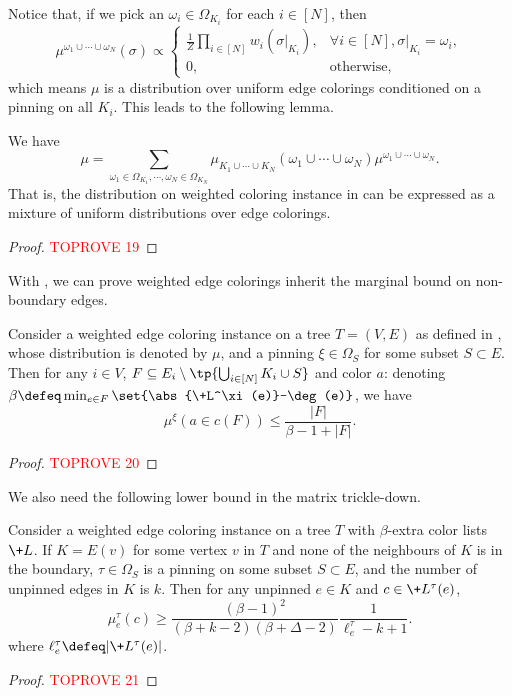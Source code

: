 \documentclass[a4paper,11pt]{article}
\begin{document}
Notice that, if we pick an $\omega_i\in\Omega_{K_i}$ for each $i\in [N]$,
then
\[\mu^{\omega_1\cup\cdots\cup \omega_N}(\sigma)
\propto
\begin{cases}
 \frac{1}{Z}   \prod_{i\in [N]} w_i(\sigma|_{K_i}),  &\forall i\in [N], \sigma|_{K_i} = \omega_i,
 \\ 0, & \text{otherwise},
\end{cases}
\]
which means $\mu$ is a distribution over uniform edge colorings conditioned on a 
pinning on all $K_i$. This leads to the following lemma.
\begin{lemma}\label{lem:weighted-decomposition-to-unweighted}
    We have
    \[
        \mu = \sum_{\omega_1\in \Omega_{K_1},\cdots, \omega_N\in \Omega_{K_N}}
        \mu_{K_1\cup\cdots\cup K_N}(\omega_1\cup\cdots\cup\omega_{N}) \mu^{\omega_1\cup\cdots\cup\omega_N}.
    \]
    That is, the distribution on weighted coloring instance in 
    can be expressed as a mixture of uniform distributions over edge colorings.
\end{lemma}
\begin{proof}\textcolor{red}{TOPROVE 19}\end{proof}

With , we can prove
weighted edge colorings inherit the marginal bound 
on non-boundary edges.
\begin{lemma}\label{lem:marginal-upper-weighted}
    Consider a weighted edge coloring instance on a tree $T=(V, E)$
    as defined in ,
    whose distribution is denoted by $\mu$, and a pinning $\xi\in \Omega_{S}$ for some subset $S\subset E$.
    Then for any $i\in V$, $F\subseteq E_i\setminus \tp{\bigcup_{i\in [N]}K_i\cup S}$ and color $a$:
    denoting $\beta\defeq\min_{e\in F}\set{\abs{\+L^\xi(e)}-\deg(e)}$, we have
    \[\mu^\xi(a\in c(F)) \le \frac{|F|}{\beta - 1 + |F|}.\]
\end{lemma}
\begin{proof}\textcolor{red}{TOPROVE 20}\end{proof}

We also need the following lower bound in the matrix trickle-down.
\begin{lemma}\label{lem:marginal-lower-weighted}
    Consider a weighted edge coloring instance on a tree $T$ with $\beta$-extra
    color lists $\+L$.
    If $K=E(v)$ for some vertex $v$ in $T$ and none of the neighbours of $K$ is in the boundary,
    $\tau\in \Omega_S$ is a pinning on some subset $S \subset E$, and the number of 
    unpinned edges in $K$ is $k$. Then for any unpinned $e\in K$ and $c\in \+L^\tau(e)$,
    \[
    \mu^{\tau}_e(c) \ge \frac{(\beta-1)^2}{(\beta+k-2)(\beta+\Delta-2)}\frac{1}{\ell_e^\tau-k+1}.
    \]
    where $\ell^\tau_e\defeq|\+L^\tau(e)|$.
\end{lemma}
\begin{proof}\textcolor{red}{TOPROVE 21}\end{proof}
\end{document}

